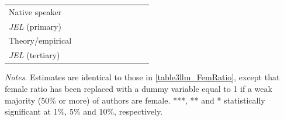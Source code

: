 \begin{table}
\begin{threeparttable}
\begin{tabular}{p{3cm}S@{}S@{}S@{}S@{}S@{}S@{}S@{}S@{}S@{}}
            Native speaker                &               &               &               &               &           {}   &           {}   &           {}   &           {}   &           {}   \\
            \textit{JEL} (primary)        &               &               &               &               &               &               &           {}   &               &               \\
            Theory/empirical              &               &               &               &               &               &               &               &           {}   &               \\
            \textit{JEL} (tertiary)       &               &               &               &               &               &               &               &               &           {}   \\
            \bottomrule
        \end{tabular}
        \begin{tablenotes}
            \tiny
            \item \textit{Notes}. Estimates are identical to those in \autoref{table3llm_FemRatio}, except that female ratio has been replaced with a dummy variable equal to 1 if a weak majority (50\% or more) of authors are female. ***, ** and * statistically significant at 1\%, 5\% and 10\%, respectively.
        \end{tablenotes}
    \end{threeparttable}

\end{table}
